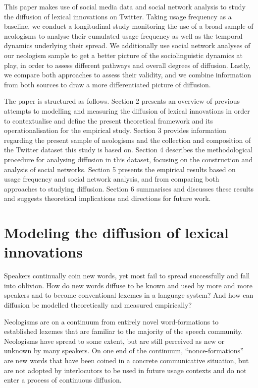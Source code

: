 \documentclass[
  a4paper,
  abstract=on,
  captions=tableabove
  ]{scrartcl}
\begin{document}
This paper makes use of social media data and social network analysis to study the diffusion of lexical innovations on Twitter. Taking usage frequency as a baseline, we conduct a longitudinal study monitoring the use of a broad sample of neologisms to analyse their cumulated usage frequency as well as the temporal dynamics underlying their spread. We additionally use social network analyses of our neologism sample to get a better picture of the sociolinguistic dynamics at play, in order to assess different pathways and overall degrees of diffusion. Lastly, we compare both approaches to assess their validity, and we combine information from both sources to draw a more differentiated picture of diffusion.

The paper is structured as follows. Section 2 presents an overview of previous attempts to modelling and measuring the diffusion of lexical innovations in order to contextualise and define the present theoretical framework and its operationalisation for the empirical study. Section 3 provides information regarding the present sample of neologisms and the collection and composition of the Twitter dataset this study is based on. Section 4 describes the methodological procedure for analysing diffusion in this dataset, focusing on the construction and analysis of social networks. Section 5 presents the empirical results based on usage frequency and social network analysis, and from comparing both approaches to studying diffusion. Section 6 summarises and discusses these results and suggests theoretical implications and directions for future work.

\section{Modeling the diffusion of lexical innovations}
  \label{sec:modeling-diff}

Speakers continually coin new words, yet most fail to spread successfully and fall into oblivion. How do new words diffuse to be known and used by more and more speakers and to become conventional lexemes in a language system? And how can diffusion be modelled theoretically and measured empirically?

Neologisms are on a continuum from entirely novel word-formations to established lexemes that are familiar to the majority of the speech community. Neologisms have spread to some extent, but are still perceived as new or unknown by many speakers. On one end of the continuum, \enquote{nonce-formations} are new words that have been coined in a concrete communicative situation, but are not adopted by interlocutors to be used in future usage contexts and do not enter a process of continuous diffusion.~ \parencite{Hohenhaus1996AdhocWortbildungTerminologie}
\end{document}

